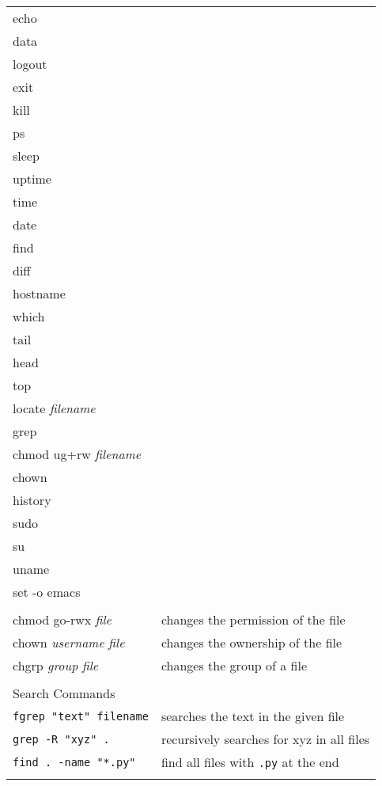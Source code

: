 \begin{center}
\begin{longtable}{|p{4cm}|p{8cm}|}
  echo & \\
  data & \\
  logout & \\
  exit & \\
  kill & \\
  ps & \\
  sleep & \\
  uptime & \\
  time & \\
  date & \\
  find & \\
  diff & \\
  hostname & \\
  which & \\
  tail & \\
  head & \\
  top & \\
  locate \textit{filename} & \\
  grep & \\
  chmod ug+rw \textit{filename} & \\
  chown & \\
  history & \\
  sudo & \\
  su & \\
  uname & \\
  set -o emacs & \\
  & \\
  
  chmod go-rwx \textit{file} & changes the permission of the file \\
  chown \textit{username} \textit{file} & changes the ownership of the file \\
  chgrp \textit{group} \textit{file} & changes the group of a file\\
  & \\

  \hline
  \multicolumn{2}{|l|}{\cellcolor{blue!15} Search Commands}\\
  \hline
  \verb|fgrep "text" filename| &  searches the text in the given file \\
  \verb|grep -R "xyz" .| & recursively searches for xyz in all files \\
  \verb|find . -name "*.py"| &  find all files with \verb|.py| at the end \\
  & \\


\end{longtable}
\end{center}

